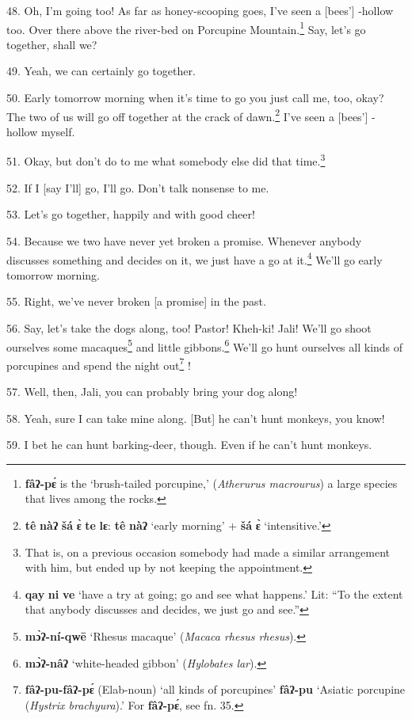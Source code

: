 48. Oh, I'm going too! As far as honey-scooping goes, I've seen a [bees'] -hollow
too. Over there above the river-bed on Porcupine Mountain.\footnote{\textbf{fâʔ-pɛ́} is the `brush-tailed porcupine,' (\textit{Atherurus macrourus}) a large species that lives among the rocks.} Say, let's go together,
shall we?

49. Yeah, we can certainly go together.

50. Early tomorrow morning when it's time to go you just call me, too, okay? The
two of us will go off together at the crack of dawn.\footnote{\textbf{tê} \textbf{nàʔ} \textbf{šá} \textbf{ɛ̀} \textbf{te} \textbf{lɛ}: \textbf{tê} \textbf{nàʔ} `early morning' + \textbf{šá} \textbf{ɛ̀} `intensitive.'} I've seen a [bees'] -hollow
myself.

51. Okay, but don't do to me what somebody else did that time.\footnote{That is, on a previous occasion somebody had made a similar arrangement with him, but ended up by not keeping the appointment.}

52. If I [say I'll] go, I'll go. Don't talk nonsense to me.

53. Let's go together, happily and with good cheer!

54. Because we two have never yet broken a promise. Whenever anybody discusses
something and decides on it, we just have a go at it.\footnote{\textbf{qay} \textbf{ni} \textbf{ve} `have a try at going; go and see what happens.' Lit: ``To the extent that anybody discusses and decides, we just go and see.''} We'll go early tomorrow
morning.

55. Right, we've never broken [a promise] in the past.

56. Say, let's take the dogs along, too! Pastor! Kheh-ki! Jali! We'll go shoot
ourselves some macaques\footnote{\textbf{mɔ̀ʔ-ní-qwē} `Rhesus macaque' (\textit{Macaca rhesus rhesus}).} and little gibbons.\footnote{\textbf{mɔ̀ʔ-nâʔ} `white-headed gibbon' (\textit{Hylobates lar}).} We'll go hunt ourselves all
kinds of porcupines and spend the night out\footnote{\textbf{fâʔ-pu-fâʔ-pɛ́} (Elab-noun) `all kinds of porcupines' \textbf{fâʔ-pu} `Asiatic porcupine (\textit{Hystrix brachyura}).' For \textbf{fâʔ-pɛ́}, see fn. 35.} !

57. Well, then, Jali, you can probably bring your dog along!

58. Yeah, sure I can take mine along. [But] he can't hunt monkeys, you know!

59. I bet he can hunt barking-deer, though. Even if he can't hunt monkeys.

